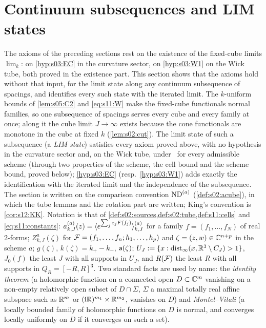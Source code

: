 \section{Continuum subsequences and LIM states}\label{sec:s12}

The axioms of the preceding sections rest on the existence of the fixed-cube limits $\lim_k$: on \cref{hyp:s03:EC} in the curvature sector, on \cref{hyp:s03:W1} on the Wick tube, both proved in the existence part. This section shows that the axioms hold without that input, for the limit state along any continuum subsequence of spacings, and identifies every such state with the iterated limit. The $k$-uniform bounds of \cref{lem:s05:C2} and \eqref{eq:s11:W} make the fixed-cube functionals normal families, so one subsequence of spacings serves every cube and every family at once; along it the cube limit $J\to\infty$ exists because the cone functionals are monotone in the cube at fixed $k$ (\cref{lem:s02:cut}). The limit state of such a subsequence (a \emph{LIM state}) satisfies every axiom proved above, with no hypothesis in the curvature sector and, on the Wick tube, under \Tthree\ for every admissible scheme (through two properties of the scheme, the cell bound and the scheme bound, proved below); \cref{hyp:s03:EC} (resp.\ \cref{hyp:s03:W1}) adds exactly the identification with the iterated limit and the independence of the subsequence. The section is written on the comparison convention $\mathrm{ND}^{(a)}$ (\cref{def:s02:acube}), in which the tube lemmas and the rotation part are written; King's convention is \cref{cor:s12:KK}. Notation is that of \cref{def:s02:sources,def:s02:tube,def:s11:cells} and \eqref{eq:s11:constants}: $a^{(a)}_{k,J}(z)=\langle e^{\sum_jz_jF(f_j)}\rangle^{(a)}_{k,J}$ for a family $f=(f_1,\dots,f_N)$ of real $2$-forms; $Z^a_{k,J}(\zeta)$ for $\mathcal F=(f_1,\dots,f_n;h_1,\dots,h_p)$ and $\zeta=(z,w)\in\mathbb C^{n+p}$ in the scheme $a$; $g(\zeta)$, $k(\zeta)=k_+-k_-$, $\mathsf a(\zeta)$; $U_J:=\{x:\operatorname{dist}_\infty(x,\mathbb R^3\setminus C_J)>1\}$, $J_0(f)$ the least $J$ with all supports in $U_J$, and $R(\mathcal F)$ the least $R$ with all supports in $Q_R=[-R,R]^3$. Two standard facts \cite{Hor90} are used by name: the \emph{identity theorem} (a holomorphic function on a connected open $D\subset\mathbb C^m$ vanishing on a non-empty relatively open subset of $D\cap\Sigma$, $\Sigma$ a maximal totally real affine subspace such as $\mathbb R^m$ or $(\mathrm i\mathbb R)^{m_1}\times\mathbb R^{m_2}$, vanishes on $D$) and \emph{Montel--Vitali} (a locally bounded family of holomorphic functions on $D$ is normal, and converges locally uniformly on $D$ if it converges on such a set).

